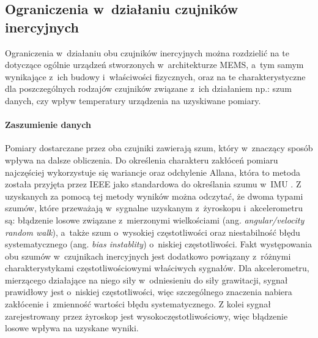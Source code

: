 \subsection{Ograniczenia w~działaniu czujników inercyjnych}
Ograniczenia w~działaniu obu czujników inercyjnych można rozdzielić na te dotyczące ogólnie urządzeń stworzonych w~architekturze MEMS, a~tym samym wynikające z~ich budowy i~właściwości fizycznych, oraz na te charakterystyczne dla poszczególnych rodzajów czujników związane z~ich działaniem np.: szum danych, czy wpływ temperatury urządzenia na uzyskiwane pomiary.
		
\paragraph*{Zaszumienie danych}
Pomiary dostarczane przez oba czujniki zawierają szum, który w~znaczący sposób wpływa na dalsze obliczenia. Do określenia charakteru zakłóceń pomiaru najczęściej wykorzystuje się wariancje oraz odchylenie Allana\cite{Allan1966}, która to metoda została przyjęta przez IEEE jako standardowa do określania szumu w~IMU \cite{IeeeAccSpec}. Z uzyskanych za pomocą tej metody wyników można odczytać, że dwoma typami szumów, które przeważają w~sygnalne uzyskanym z~żyroskopu i~akcelerometru są: błądzenie losowe związane z~mierzonymi wielkościami (ang. \emph{angular/velocity random walk}), a~także szum o~wysokiej częstotliwości oraz niestabilność błędu systematycznego (ang. \emph{bias instablity}) o~niskiej częstotliwości. Fakt występowania obu szumów w~czujnikach inercyjnych jest dodatkowo powiązany z~różnymi charakterystykami częstotliwościowymi właściwych sygnałów. Dla akcelerometru, mierzącego działające na niego siły w~odniesieniu do siły grawitacji, sygnał prawidłowy jest o~niskiej częstotliwości, więc szczególnego znaczenia nabiera zakłócenie i~zmienność wartości błędu systematycznego. Z kolei sygnał zarejestrowany przez żyroskop jest wysokoczęstotliwościowy, więc błądzenie losowe wpływa na uzyskane wyniki.
		
